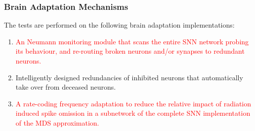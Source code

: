 \subsubsection{Brain Adaptation Mechanisms}\label{subsubsec:brain_adaptation_mechanisms}
The tests are performed on the following brain adaptation implementations:
\begin{enumerate}
    \item \textcolor{red}{An Neumann monitoring module that scans the entire SNN network probing its behaviour, and re-routing broken neurons and/or synapses to redundant neurons.}
    \item Intelligently designed redundancies of inhibited neurons that automatically take over from deceased neurons.
    \item \textcolor{red}{A rate-coding frequency adaptation to reduce the relative impact of radiation induced spike omission in a subnetwork of the complete SNN implementation of the MDS approximation.}
\end{enumerate}